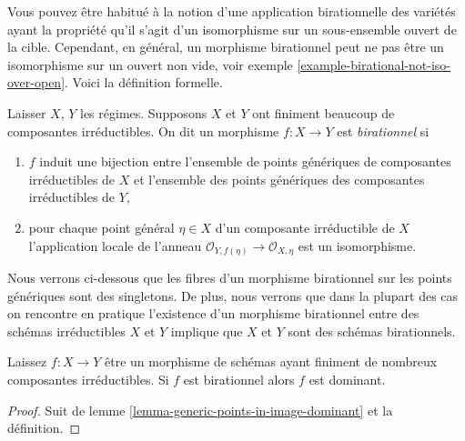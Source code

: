 \noindent
Vous pouvez être habitué à la notion d'une application birationnelle des variétés ayant la propriété qu'il s'agit d'un isomorphisme sur un sous-ensemble ouvert de la cible. Cependant, en général, un morphisme birationnel peut ne pas être un isomorphisme sur un ouvert non vide, voir exemple \ref{example-birational-not-iso-over-open}. Voici la définition formelle.

\begin{definition}

\label{definition-birational}

\begin{reference}

\cite[(2.2.9)]{EGA1}

\end{reference}

Laisser $X$, $Y$ les régimes. Supposons $X$ et $Y$ ont finiment beaucoup de composantes irréductibles. On dit un morphisme $f : X \to Y$ est {\it birationnel} si

\begin{enumerate}

\item  $f$ induit une bijection entre l'ensemble de points génériques de composantes irréductibles de $X$ et l'ensemble des points génériques des composantes irréductibles de $Y$,
\item pour chaque point général $\eta \in X$ d'un composante irréductible de $X$ l'application locale de l'anneau
$\mathcal{O}_{Y, f(\eta)} \to \mathcal{O}_{X, \eta}$
est un isomorphisme.

\end{enumerate}

\end{definition}

\noindent
Nous verrons ci-dessous que les fibres d'un morphisme birationnel sur les points génériques sont des singletons. De plus, nous verrons que dans la plupart des cas on rencontre en pratique l'existence d'un morphisme birationnel entre des schémas irréductibles $X$ et $Y$ implique que $X$ et $Y$ sont des schémas birationnels.

\begin{lemma}

\label{lemma-birational-dominant}
Laissez $f : X \to Y$ être un morphisme de schémas ayant finiment de nombreux composantes irréductibles. Si $f$ est birationnel alors $f$ est dominant.
\end{lemma}

\begin{proof}
Suit de lemme \ref{lemma-generic-points-in-image-dominant} et la définition.
\end{proof}

